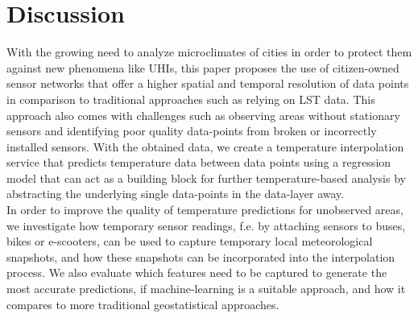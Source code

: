 \chapter{Discussion}

With the growing need to analyze microclimates of cities in order to protect them against new phenomena like UHIs, this paper proposes the use of citizen-owned sensor networks that offer a higher spatial and temporal resolution of data points in comparison to traditional approaches such as relying on LST data. This approach also comes with challenges such as observing areas without stationary sensors and identifying poor quality data-points from broken or incorrectly installed sensors. With the obtained data, we create a temperature interpolation service that predicts temperature data between data points using a regression model that can act as a building block for further temperature-based analysis by abstracting the underlying single data-points in the data-layer away.\\
In order to improve the quality of temperature predictions for unobserved areas, we investigate how temporary sensor readings, f.e. by attaching sensors to buses, bikes or e-scooters, can be used to capture temporary local meteorological snapshots, and how these snapshots can be incorporated into the interpolation process. We also evaluate which features need to be captured to generate the most accurate predictions, if machine-learning is a suitable approach, and how it compares to more traditional geostatistical approaches.